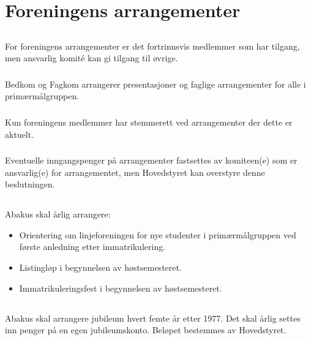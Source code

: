 \section{Foreningens arrangementer}

\subsection{}
\subsubsection{}
For foreningens arrangementer er det fortrinnsvis medlemmer som har tilgang, men ansvarlig komité kan gi tilgang til øvrige.

\subsubsection{}
Bedkom og Fagkom arrangerer presentasjoner og faglige arrangementer for alle i primærmålgruppen.

\subsubsection{}
Kun foreningens medlemmer har stemmerett ved arrangementer der dette er aktuelt.

\subsubsection{}
Eventuelle inngangspenger på arrangementer fastsettes av komiteen(e) som er
ansvarlig(e) for arrangementet, men Hovedstyret kan overstyre denne
beslutningen.

\subsection{}
Abakus skal årlig arrangere:

\begin{itemize}
  \item Orientering om linjeforeningen for nye studenter i primærmålgruppen ved første anledning etter immatrikulering.
  \item Listingløp i begynnelsen av høstsemesteret.
  \item Immatrikuleringsfest i begynnelsen av høstsemesteret.
\end{itemize}

\subsection{}
Abakus skal arrangere jubileum hvert femte år etter 1977. Det skal årlig settes inn penger
på en egen jubileumskonto. Beløpet bestemmes av Hovedstyret.
